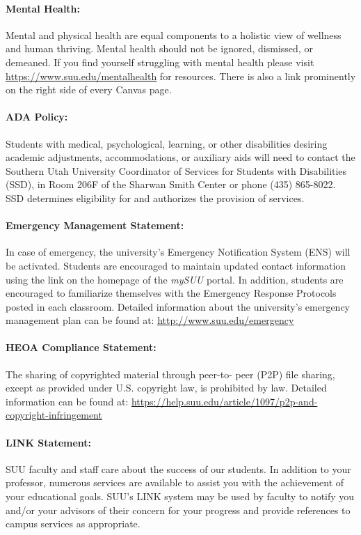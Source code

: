 \documentclass[12pt, letterpaper]{article}
\begin{document}
\paragraph{Mental Health:}
Mental and physical health are equal components to a holistic view of wellness and human thriving. Mental health should not be ignored, dismissed, or demeaned. If you find yourself struggling with mental health please visit \href{https://www.suu.edu/mentalhealth}{https://www.suu.edu/mentalhealth} for resources. There is also a link prominently on the right side of every Canvas page.

\paragraph{ADA Policy:}
Students with medical, psychological, learning, or other disabilities desiring academic adjustments, accommodations, or auxiliary aids will need to contact the Southern Utah University Coordinator of Services for Students with Disabilities (SSD), in Room 206F of the Sharwan Smith Center or phone (435) 865-8022. SSD determines eligibility for and authorizes the provision of services.

\paragraph{Emergency Management Statement:}
In case of emergency, the university's Emergency Notification System (ENS) will be activated. Students are encouraged to maintain updated contact information using the link on the homepage of the \emph{mySUU} portal. In addition, students are encouraged to familiarize themselves with the Emergency Response Protocols posted in each classroom. Detailed information about the university's emergency management plan can be found at: \href{http://www.suu.edu/emergency}{http://www.suu.edu/emergency}

\paragraph{HEOA Compliance Statement:}
The sharing of copyrighted material through peer-to- peer (P2P) file sharing, except as provided under U.S. copyright law, is prohibited by law. Detailed information can be found at: \href{https://help.suu.edu/article/1097/p2p-and-copyright-infringement}{https://help.suu.edu/article/1097/p2p-and-copyright-infringement}

\paragraph{LINK Statement:}
SUU faculty and staff care about the success of our students. In addition to your professor, numerous services are available to assist you with the achievement of your educational goals. SUU's LINK system may be used by faculty to notify you and/or your advisors of their concern for your progress and provide references to campus services as appropriate.
\end{document}
